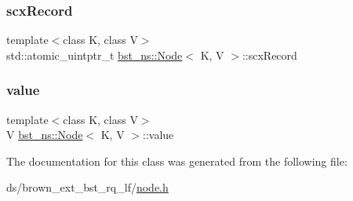 \subsubsection{\texorpdfstring{scx\+Record}{scxRecord}}
{\footnotesize\ttfamily template$<$class K, class V$>$ \\
std\+::atomic\+\_\+uintptr\+\_\+t \hyperlink{classbst__ns_1_1Node}{bst\+\_\+ns\+::\+Node}$<$ K, V $>$\+::scx\+Record}

\mbox{\label{classbst__ns_1_1Node_adb140ea18301e8c5c51a8083571c3632}} 
\subsubsection{\texorpdfstring{value}{value}}
{\footnotesize\ttfamily template$<$class K, class V$>$ \\
V \hyperlink{classbst__ns_1_1Node}{bst\+\_\+ns\+::\+Node}$<$ K, V $>$\+::value}



The documentation for this class was generated from the following file\+:\begin{DoxyCompactItemize}
\item 
ds/brown\+\_\+ext\+\_\+bst\+\_\+rq\+\_\+lf/\hyperlink{node_8h}{node.\+h}\end{DoxyCompactItemize}

